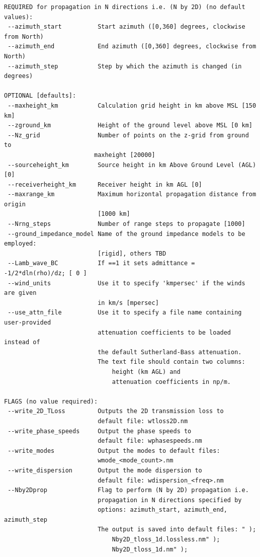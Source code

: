 \begin{verbatim}
REQUIRED for propagation in N directions i.e. (N by 2D) (no default values):
 --azimuth_start          Start azimuth ([0,360] degrees, clockwise from North)
 --azimuth_end            End azimuth ([0,360] degrees, clockwise from North)
 --azimuth_step           Step by which the azimuth is changed (in degrees)

OPTIONAL [defaults]:
 --maxheight_km           Calculation grid height in km above MSL [150 km]
 --zground_km             Height of the ground level above MSL [0 km]
 --Nz_grid                Number of points on the z-grid from ground to
                         maxheight [20000]
 --sourceheight_km        Source height in km Above Ground Level (AGL) [0]
 --receiverheight_km      Receiver height in km AGL [0]
 --maxrange_km            Maximum horizontal propagation distance from origin 
                          [1000 km]
 --Nrng_steps             Number of range steps to propagate [1000]
 --ground_impedance_model Name of the ground impedance models to be employed:
                          [rigid], others TBD
 --Lamb_wave_BC           If ==1 it sets admittance = -1/2*dln(rho)/dz; [ 0 ]
 --wind_units             Use it to specify 'kmpersec' if the winds are given 
                          in km/s [mpersec]
 --use_attn_file          Use it to specify a file name containing user-provided
                          attenuation coefficients to be loaded instead of 
                          the default Sutherland-Bass attenuation. 
                          The text file should contain two columns: 
                              height (km AGL) and 
                              attenuation coefficients in np/m.

FLAGS (no value required):
 --write_2D_TLoss         Outputs the 2D transmission loss to
                          default file: wtloss2D.nm
 --write_phase_speeds     Output the phase speeds to
                          default file: wphasespeeds.nm
 --write_modes            Output the modes to default files:
                          wmode_<mode_count>.nm
 --write_dispersion       Output the mode dispersion to
                          default file: wdispersion_<freq>.nm
 --Nby2Dprop              Flag to perform (N by 2D) propagation i.e.
                          propagation in N directions specified by
                          options: azimuth_start, azimuth_end, azimuth_step
                          The output is saved into default files: " );  
                              Nby2D_tloss_1d.lossless.nm" );
                              Nby2D_tloss_1d.nm" );
 

\end{verbatim}
